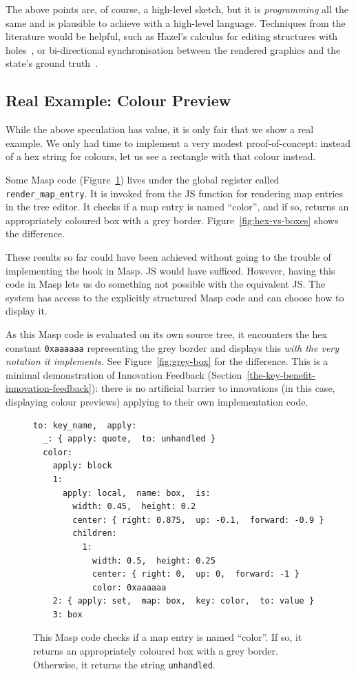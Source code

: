 \documentclass[ twoside,openright,titlepage,numbers=noenddot,headinclude,footinclude,cleardoublepage=empty,abstract=on,
                BCOR=5mm,paper=a4,fontsize=11pt
                ]{scrreprt}
\theoremstyle{definition}
\begin{document}
The above points are, of course, a high-level sketch, but it is
\emph{programming} all the same and is plausible to achieve with a
high-level language. Techniques from the literature would be helpful,
such as Hazel's calculus for editing structures with
holes~\parencite{Hazel}, or bi-directional synchronisation between the
rendered graphics and the state's ground truth~\parencite{SnS}.

\hypertarget{real-example-colour-preview}{\subsection{Real Example: Colour
Preview}\label{real-example-colour-preview}}

While the above speculation has value, it is only fair that we show a
real example. We only had time to implement a very modest
proof-of-concept: instead of a hex string for colours, let us see a
rectangle with that colour instead.

Some Masp code (Figure~\ref{lst:rendermapentry}) lives under the global
register called \texttt{render\_map\_entry}. It is invoked from the
\ac{JS} function for rendering map entries in the tree editor. It checks
if a map entry is named ``color'', and if so, returns an appropriately
coloured box with a grey border. Figure~\ref{fig:hex-vs-boxes} shows the
difference.

These results so far could have been achieved without going to the
trouble of implementing the hook in Masp. \ac{JS} would have sufficed.
However, having this code in Masp lets us do something not possible with
the equivalent \ac{JS}. The system has access to the explicitly
structured Masp code and can choose how to display it.

As this Masp code is evaluated on its own source tree, it encounters the
hex constant \texttt{0xaaaaaa} representing the grey border and displays
this \emph{with the very notation it implements.} See
Figure~\ref{fig:grey-box} for the difference. This is a minimal
demonstration of Innovation Feedback
(Section~\ref{the-key-benefit-innovation-feedback}): there is no
artificial barrier to innovations (in this case, displaying colour
previews) applying to their own implementation code.

\begin{figure}
\begin{lstlisting}
to: key_name,  apply:
  _: { apply: quote,  to: unhandled }
  color:
    apply: block
    1:
      apply: local,  name: box,  is:
        width: 0.45,  height: 0.2
        center: { right: 0.875,  up: -0.1,  forward: -0.9 }
        children:
          1:
            width: 0.5,  height: 0.25
            center: { right: 0,  up: 0,  forward: -1 }
            color: 0xaaaaaa
    2: { apply: set,  map: box,  key: color,  to: value }
    3: box
\end{lstlisting}
\caption[Masp code for local colour preview]{This Masp code checks if a map entry is named ``color''. If so, it returns an appropriately coloured box with a grey border. Otherwise, it returns the string \texttt{unhandled}.}
\label{lst:rendermapentry}
\end{figure}
\end{document}
